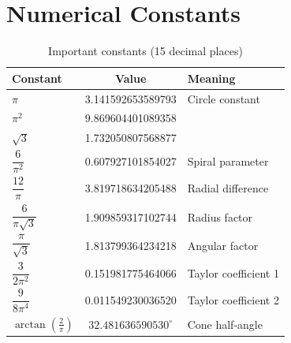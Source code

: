 \clearpage

\section{Numerical Constants}

\begin{table}[h]
\centering
\caption{Important constants (15 decimal places)}
\begin{tabular}{lcl}
\toprule
\textbf{Constant} & \textbf{Value} & \textbf{Meaning} \\
\midrule
$\pi$ & 3.141592653589793 & Circle constant \\
$\pi^2$ & 9.869604401089358 & \\
$\sqrt{3}$ & 1.732050807568877 & \\
$\dfrac{6}{\pi^2}$ & 0.607927101854027 & Spiral parameter \\
$\dfrac{12}{\pi}$ & 3.819718634205488 & Radial difference \\
$\dfrac{6}{\pi\sqrt{3}}$ & 1.909859317102744 & Radius factor \\
$\dfrac{\pi}{\sqrt{3}}$ & 1.813799364234218 & Angular factor \\
$\dfrac{3}{2\pi^2}$ & 0.151981775464066 & Taylor coefficient 1 \\
$\dfrac{9}{8\pi^4}$ & 0.011549230036520 & Taylor coefficient 2 \\
$\arctan(\frac{2}{\pi})$ & $32.481636590530^\circ$ & Cone half-angle \\
\bottomrule
\end{tabular}
\end{table}
